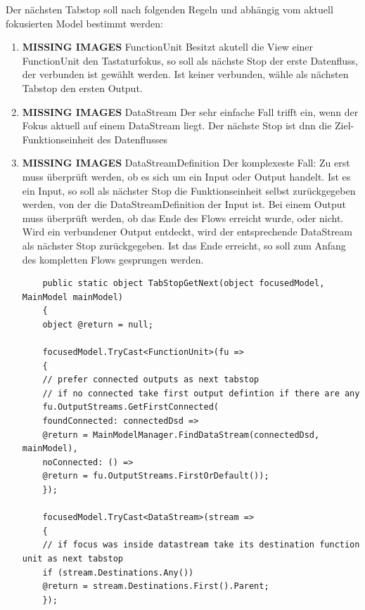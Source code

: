 Der nächsten Tabstop soll nach folgenden Regeln und abhängig vom aktuell
fokusierten Model bestimmt werden:

\begin{enumerate}
	\item {\bfseries\sffamily MISSING IMAGES} FunctionUnit
	\label{sec:orgheadline27}
	Besitzt akutell die View einer FunctionUnit den Tastaturfokus, so soll als
	nächste Stop der erste Datenfluss, der verbunden ist gewählt werden. Ist keiner
	verbunden, wähle als nächsten Tabstop den ersten Output.
	
	\item {\bfseries\sffamily MISSING IMAGES} DataStream
	\label{sec:orgheadline28}
	Der sehr einfache Fall trifft ein, wenn der Fokus aktuell auf einem
	DataStream liegt. Der nächste Stop ist dnn die Ziel-Funktionseinheit des Datenflusses
	
	\item {\bfseries\sffamily MISSING IMAGES} DataStreamDefinition
	\label{sec:orgheadline29}
	Der komplexeste Fall: 
	Zu erst muss überprüft werden, ob es sich um ein Input oder Output
	handelt. Ist es ein Input, so soll als nächster Stop die Funktionseinheit
	selbst zurückgegeben werden, von der die DataStreamDefinition der Input ist. 
	Bei einem Output muss überprüft werden, ob das Ende des Flows erreicht
	wurde, oder nicht. Wird ein verbundener Output entdeckt, wird der
	entsprechende DataStream als nächster Stop zurückgegeben. Ist das Ende
	erreicht, so soll zum Anfang des kompletten Flows gesprungen werden.
	
	\begin{verbatim}
	public static object TabStopGetNext(object focusedModel, MainModel mainModel)
	{
	object @return = null;
	
	focusedModel.TryCast<FunctionUnit>(fu =>
	{
	// prefer connected outputs as next tabstop
	// if no connected take first output defintion if there are any
	fu.OutputStreams.GetFirstConnected(
	foundConnected: connectedDsd => 
	@return = MainModelManager.FindDataStream(connectedDsd, mainModel),
	noConnected: () => 
	@return = fu.OutputStreams.FirstOrDefault());
	});
	
	focusedModel.TryCast<DataStream>(stream =>
	{
	// if focus was inside datastream take its destination function unit as next tabstop
	if (stream.Destinations.Any())
	@return = stream.Destinations.First().Parent;
	});
	

\end{verbatim}
\end{enumerate}
